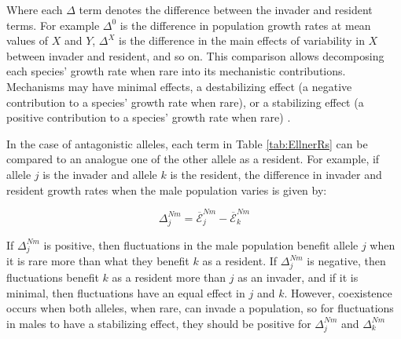 Where each $\Delta$ term denotes the difference between the invader and resident terms. For example $\Delta^{0}$  is the difference in population growth rates at mean values of $X$ and $Y$, $\Delta^{X}$ is the difference in the main effects of variability in $X$ between invader and resident, and so on. This comparison allows decomposing each species' growth rate when rare into its mechanistic contributions. Mechanisms may have minimal effects, a destabilizing effect (a negative contribution to a species' growth rate when rare), or a stabilizing effect (a positive contribution to a species' growth rate when rare) \citep{shoemaker2020}.

In the case of antagonistic alleles, each term in Table \ref{tab:EllnerRs} can be compared to an analogue one of the other allele as a resident. For example, if allele $j$ is the invader and allele $k$ is the resident, the difference in invader and resident growth rates when the male population varies is given by:


\begin{equation}
\Delta^{Nm}_{j}= \overline{\mathcal{E}}^{Nm}_{j} - \overline{\mathcal{E}}^{Nm}_{k}
\label{delta}
\end{equation}

If $\Delta^{Nm}_{j}$ is positive, then fluctuations in the male population benefit allele $j$ when it is rare more than what they benefit $k$ as a resident. If $\Delta^{Nm}_{j}$ is negative, then fluctuations benefit $k$ as a resident more than $j$ as an invader, and if it is minimal, then fluctuations have an equal effect in $j$ and $k$. However, coexistence occurs when both alleles, when rare, can invade a population, so for fluctuations in males to have a stabilizing effect, they should be positive for $\Delta^{Nm}_{j}$ and $\Delta^{Nm}_{k}$
